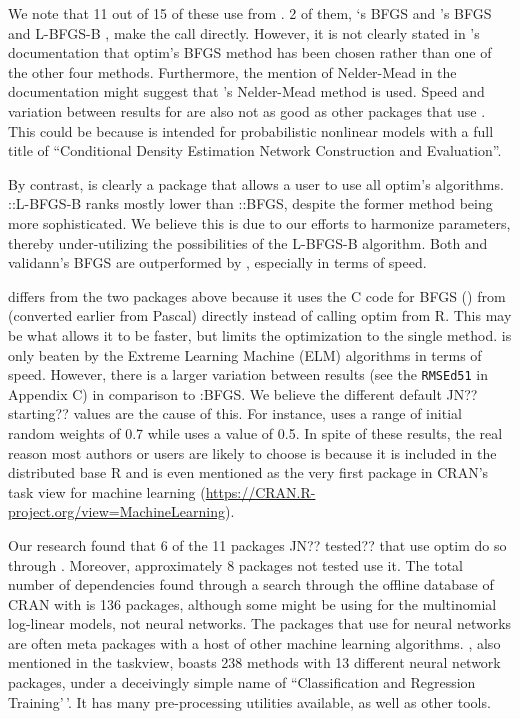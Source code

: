 We note that 11 out of 15 of these  use
 from . 2 of them, `s BFGS
\citep{R-CaDENCE} and 's BFGS and L-BFGS-B
\citep{R-validann}, make the call directly. However, it is not clearly
stated in 's documentation that optim's BFGS method has
been chosen rather than one of the other four methods. Furthermore, the
mention of Nelder-Mead in the documentation might suggest that
's Nelder-Mead method is used. Speed and variation between
results for  are also not as good as other packages
that use . This could be because  is
intended for probabilistic nonlinear models with a full title of
``Conditional Density Estimation Network Construction and Evaluation''.

By contrast,  is clearly a package that allows a user
to use all optim's algorithms. ::L-BFGS-B ranks mostly
lower than ::BFGS, despite the former method being
more sophisticated. We believe this is due to our efforts to harmonize
parameters, thereby under-utilizing the possibilities of the L-BFGS-B
algorithm. Both  and validann's BFGS are outperformed
by , especially in terms of speed.

 \citep{R-nnet} differs from the two packages above
because it uses the \textsf{C} code for BFGS () from
 (converted earlier from Pascal) directly instead of calling
optim from \textsf{R}. This may be what allows it to be faster, but
limits the optimization to the single method.  is only
beaten by the Extreme Learning Machine (ELM) algorithms in terms of
speed. However, there is a larger variation between results (see the
\texttt{RMSEd51} in Appendix C) in comparison to
:BFGS. We believe the different default JN??
starting?? values are the cause of this. For instance, 
uses a range of initial random weights of 0.7 while 
uses a value of 0.5. In spite of these results, the real reason most
authors or users are likely to choose  is because it is
included in the distributed base \textsf{R} and is even mentioned as the
very first package in CRAN's task view for machine learning
(\url{https://CRAN.R-project.org/view=MachineLearning}).

Our research found that 6 of the 11 packages JN?? tested?? that use
optim do so through . Moreover, approximately 8 packages
not tested use it. The total number of  dependencies found
through a search through the offline database of CRAN with
 is 136 packages, although some might be using
 for the multinomial log-linear models, not neural
networks. The packages that use  for neural networks are
often meta packages with a host of other machine learning algorithms.
 \citep{R-caret}, also mentioned in the taskview, boasts
238 methods with 13 different neural network packages, under a
deceivingly simple name of ``Classification and Regression Training'\,'.
It has many pre-processing utilities available, as well as other tools.

